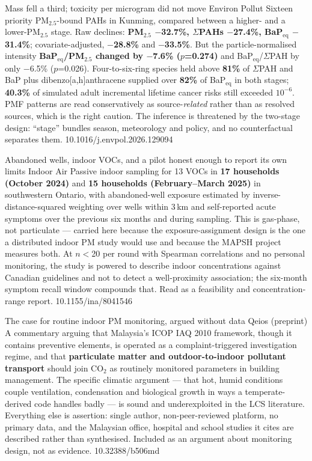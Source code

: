 \documentclass[10pt]{article}
\begin{document}
{Mass fell a third; toxicity per microgram did not move}
{Environ Pollut}
{Sixteen priority PM$_{2.5}$-bound PAHs in Kunming, compared between a higher- and a
lower-PM$_{2.5}$ stage. Raw declines: \textbf{PM$_{2.5}$ $-$32.7\%,
$\Sigma$PAHs $-$27.4\%, BaP$_{\mathrm{eq}}$ $-$31.4\%}; covariate-adjusted,
\textbf{$-$28.8\%} and \textbf{$-$33.5\%}. But the particle-normalised intensity
\textbf{BaP$_{\mathrm{eq}}$/PM$_{2.5}$ changed by $-$7.6\% ($p$=0.274)} and
BaP$_{\mathrm{eq}}$/$\Sigma$PAH by only $-$6.5\% ($p$=0.026). Four-to-six-ring species held
above \textbf{81\%} of $\Sigma$PAH and BaP plus dibenzo[a,h]anthracene supplied over
\textbf{82\%} of BaP$_{\mathrm{eq}}$ in both stages; \textbf{40.3\%} of simulated adult
incremental lifetime cancer risks still exceeded $10^{-6}$. PMF patterns are read
conservatively as source-\emph{related} rather than as resolved sources, which is the
right caution. The inference is threatened by the two-stage design: ``stage'' bundles
season, meteorology and policy, and no counterfactual separates them.}
{10.1016/j.envpol.2026.129094}

{Abandoned wells, indoor VOCs, and a pilot honest enough to report its own limits}
{Indoor Air}
{Passive indoor sampling for 13 VOCs in \textbf{17 households (October 2024)} and
\textbf{15 households (February--March 2025)} in southwestern Ontario, with abandoned-well
exposure estimated by inverse-distance-squared weighting over wells within 3\,km and
self-reported acute symptoms over the previous six months and during sampling. This is
gas-phase, not particulate --- carried here because the exposure-assignment design is the
one a distributed indoor PM study would use and because the MAPSH project measures both.
At $n$$<$20 per round with Spearman correlations and no personal monitoring, the study is
powered to describe indoor concentrations against Canadian guidelines and not to detect a
well-proximity association; the six-month symptom recall window compounds that. Read as a
feasibility and concentration-range report.}
{10.1155/ina/8041546}


{The case for routine indoor PM monitoring, argued without data}
{Qeios (preprint)}
{A commentary arguing that Malaysia's ICOP IAQ 2010 framework, though it contains
preventive elements, is operated as a complaint-triggered investigation regime, and that
\textbf{particulate matter and outdoor-to-indoor pollutant transport} should join CO$_2$ as
routinely monitored parameters in building management. The specific climatic argument ---
that hot, humid conditions couple ventilation, condensation and biological growth in ways a
temperate-derived code handles badly --- is sound and underexploited in the LCS literature.
Everything else is assertion: single author, non-peer-reviewed platform, no primary data,
and the Malaysian office, hospital and school studies it cites are described rather than
synthesised. Included as an argument about monitoring design, not as evidence.}
{10.32388/b506md}
\end{document}
